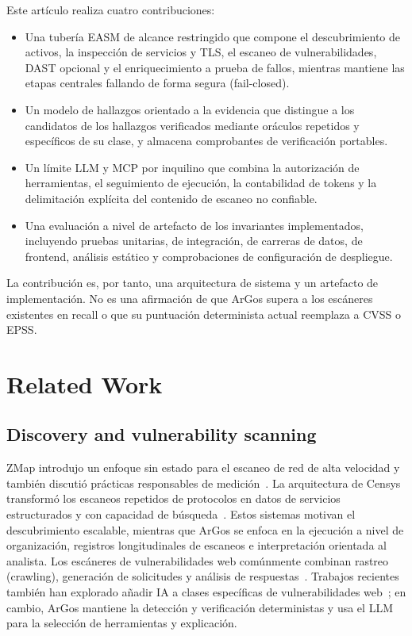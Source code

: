 \documentclass[conference,a4paper]{IEEEtran}
\newcommand{\argos}{ArGos\xspace}
\begin{document}
Este artículo realiza cuatro contribuciones:
\begin{itemize}
    \item Una tubería EASM de alcance restringido que compone el descubrimiento de activos, la inspección de servicios y TLS, el escaneo de vulnerabilidades, DAST opcional y el enriquecimiento a prueba de fallos, mientras mantiene las etapas centrales fallando de forma segura (fail-closed).
    \item Un modelo de hallazgos orientado a la evidencia que distingue a los candidatos de los hallazgos verificados mediante oráculos repetidos y específicos de su clase, y almacena comprobantes de verificación portables.
    \item Un límite LLM y MCP por inquilino que combina la autorización de herramientas, el seguimiento de ejecución, la contabilidad de tokens y la delimitación explícita del contenido de escaneo no confiable.
    \item Una evaluación a nivel de artefacto de los invariantes implementados, incluyendo pruebas unitarias, de integración, de carreras de datos, de frontend, análisis estático y comprobaciones de configuración de despliegue.
\end{itemize}

La contribución es, por tanto, una arquitectura de sistema y un artefacto de implementación. No es una afirmación de que \argos supera a los escáneres existentes en recall o que su puntuación determinista actual reemplaza a CVSS o EPSS.

\section{Related Work}

\subsection{Discovery and vulnerability scanning}

ZMap introdujo un enfoque sin estado para el escaneo de red de alta velocidad y también discutió prácticas responsables de medición~\cite{Durumeric2013ZMap}. La arquitectura de Censys transformó los escaneos repetidos de protocolos en datos de servicios estructurados y con capacidad de búsqueda~\cite{Durumeric2015Censys}. Estos sistemas motivan el descubrimiento escalable, mientras que \argos se enfoca en la ejecución a nivel de organización, registros longitudinales de escaneos e interpretación orientada al analista. Los escáneres de vulnerabilidades web comúnmente combinan rastreo (crawling), generación de solicitudes y análisis de respuestas~\cite{Chen2020WebScanner}. Trabajos recientes también han explorado añadir IA a clases específicas de vulnerabilidades web~\cite{Manivannan2025AIScanner}; en cambio, \argos mantiene la detección y verificación deterministas y usa el LLM para la selección de herramientas y explicación.
\end{document}
